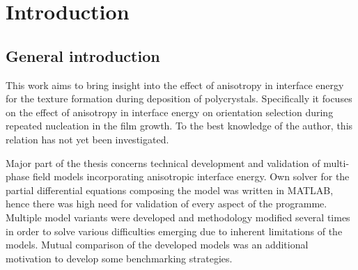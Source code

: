 \chapter{Introduction} \label{ch_introduction}


\section{General introduction}
This work aims to bring insight into the effect of anisotropy in interface energy for the texture formation during deposition of polycrystals. Specifically it focuses on the effect of anisotropy in interface energy on orientation selection during repeated nucleation in the film growth. To the best knowledge of the author, this relation has not yet been investigated.

Major part of the thesis concerns technical development and validation of multi-phase field models incorporating anisotropic interface energy. Own solver for the partial differential equations composing the model was written in MATLAB, hence there was high need for validation of every aspect of the programme. Multiple model variants were developed and methodology modified several times in order to solve various difficulties emerging due to inherent limitations of the models. Mutual comparison of the developed models was an additional motivation to develop some benchmarking strategies.


